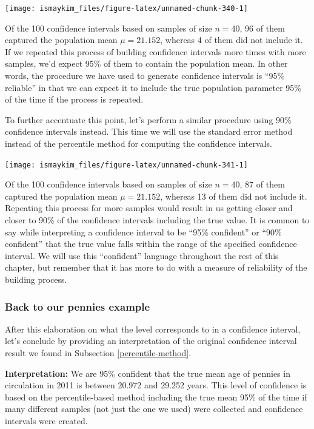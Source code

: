 \documentclass[12pt,]{krantz}
\begin{document}
\begin{center}\texttt{[image: ismaykim\_files/figure-latex/unnamed-chunk-340-1]} \end{center}

Of the 100 confidence intervals based on samples of size \(n = 40\), 96
of them captured the population mean \(\mu = 21.152\), whereas 4 of them
did not include it. If we repeated this process of building confidence
intervals more times with more samples, we'd expect 95\% of them to
contain the population mean. In other words, the procedure we have used
to generate confidence intervals is ``95\% reliable'' in that we can
expect it to include the true population parameter 95\% of the time if
the process is repeated.

To further accentuate this point, let's perform a similar procedure
using 90\% confidence intervals instead. This time we will use the
standard error method instead of the percentile method for computing the
confidence intervals.

\begin{center}\texttt{[image: ismaykim\_files/figure-latex/unnamed-chunk-341-1]} \end{center}

Of the 100 confidence intervals based on samples of size \(n = 40\), 87
of them captured the population mean \(\mu = 21.152\), whereas 13 of
them did not include it. Repeating this process for more samples would
result in us getting closer and closer to 90\% of the confidence
intervals including the true value. It is common to say while
interpreting a confidence interval to be ``95\% confident'' or ``90\%
confident'' that the true value falls within the range of the specified
confidence interval. We will use this ``confident'' language throughout
the rest of this chapter, but remember that it has more to do with a
measure of reliability of the building process.

\subsubsection*{Back to our pennies
example}\label{back-to-our-pennies-example}


After this elaboration on what the level corresponds to in a confidence
interval, let's conclude by providing an interpretation of the original
confidence interval result we found in Subsection
\ref{percentile-method}.

\textbf{Interpretation:} We are 95\% confident that the true mean age of
pennies in circulation in 2011 is between 20.972 and 29.252 years. This
level of confidence is based on the percentile-based method including
the true mean 95\% of the time if many different samples (not just the
one we used) were collected and confidence intervals were created.
\end{document}
